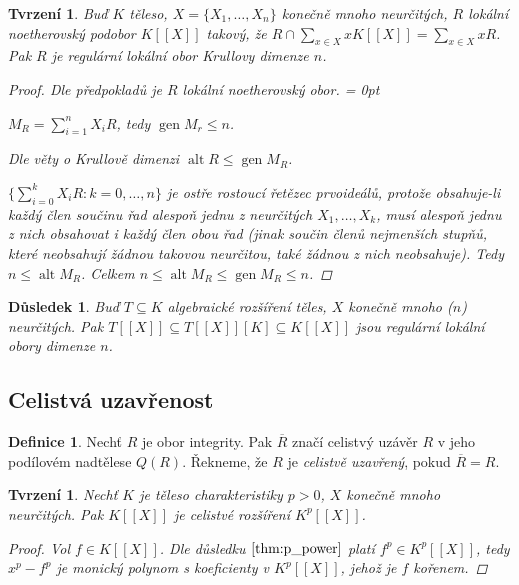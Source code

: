 \documentclass[11pt,a4paper]{article}
\DeclareMathOperator{\alt}{alt} %
\DeclareMathOperator{\gen}{gen} %
\let \icl \overline %
\newenvironment{items}{%
	\itemize
	\itemsep = 0pt%
}{%
	\enditemize
}
\newcounter{numb}
\theoremstyle{definition}
\newtheorem*{definice}{Definice}
\theoremstyle{plain}
\newtheorem{tvrzeni}[numb]{Tvrzení}
\newtheorem{dusledek}[numb]{Důsledek}
\begin{document}
\begin{tvrzeni} \label{thm:R_reg}
	Buď $K$ těleso, $X = \{X_1, \hdots, X_n\}$ konečně mnoho neurčitých, $R$ lokální noetherovský podobor $K[[X]]$ takový, že $R \cap \sum_{x \in X} x K[[X]] = \sum_{x \in X} x R$. Pak $R$ je regulární lokální obor Krullovy dimenze $n$.

	\begin{proof}
		Dle předpokladů je $R$ lokální noetherovský obor.
		\begin{items}
			\item $M_R = \sum_{i = 1}^n X_i R$, tedy $\gen M_r \leq n$.
			\item Dle věty o Krullově dimenzi $\alt R \leq \gen M_R$.
			\item $\{\sum_{i = 0}^k X_i R: k = 0, \hdots, n\}$ je ostře rostoucí řetězec prvoideálů, protože obsahuje-li každý člen součinu řad alespoň jednu z neurčitých $X_1, \hdots, X_k$, musí alespoň jednu z nich obsahovat i každý člen obou řad (jinak součin členů nejmenších stupňů, které neobsahují žádnou takovou neurčitou, také žádnou z nich neobsahuje). Tedy $n \leq \alt M_R$.
		\end{items}
		Celkem $n \leq \alt M_R \leq \gen M_R \leq n$.
	\end{proof}
\end{tvrzeni}

\begin{dusledek} \label{thm:reg}
	Buď $T \subseteq K$ algebraické rozšíření těles, $X$ konečně mnoho ($n$) neurčitých. Pak $T[[X]] \subseteq T[[X]][K] \subseteq K[[X]]$ jsou regulární lokální obory dimenze $n$.
\end{dusledek}


\subsection{Celistvá uzavřenost}

\begin{definice}
	Nechť $R$ je obor integrity. Pak $\icl{R}$ značí celistvý uzávěr $R$ v jeho podílovém nadtělese $Q(R)$. Řekneme, že $R$ je \emph{celistvě uzavřený}, pokud $\icl{R} = R$.
\end{definice}

\begin{tvrzeni}	\label{thm:KX_integral}
	Nechť $K$ je těleso charakteristiky $p > 0$, $X$ konečně mnoho neurčitých. Pak $K[[X]]$ je celistvé rozšíření $K^p[[X]]$.

	\begin{proof}
		Vol $f \in K[[X]]$. Dle důsledku $\ref{thm:p_power}$ platí $f^p \in K^p[[X]]$, tedy $x^p - f^p$ je monický polynom s koeficienty v $K^p[[X]]$, jehož je $f$ kořenem.
	\end{proof}
\end{tvrzeni}
\end{document}
